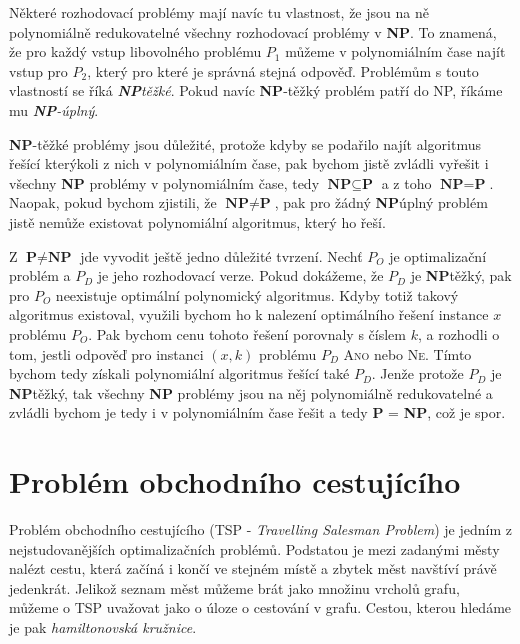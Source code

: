 \documentclass[
  printversion=false,
  joinlists=true,
  glossaries=true,
  figures=true,
  tables=true,
  sourcecodes=false,
  theorems=false,
  bibencoding=utf8,
  language=czech,
  encoding=utf8,
  program=infpvs,
  index=true,
  biblatex=true
]{kidiplom}
\begin{document}
Některé rozhodovací problémy mají navíc tu vlastnost, že jsou na ně polynomiálně redukovatelné všechny rozhodovací problémy v \textbf{NP}. To znamená, že pro každý vstup libovolného problému $P_1$ můžeme v polynomiálním čase najít vstup pro $P_2$, který pro které je správná stejná odpověď. Problémům s touto vlastností se říká \textit{\textbf{NP}\textendash těžké}. Pokud navíc \textbf{NP}-těžký problém patří do NP, říkáme mu \textit{\textbf{NP}-úplný}.

\textbf{NP}-těžké problémy jsou důležité, protože kdyby se podařilo najít algoritmus řešící kterýkoli z nich v polynomiálním čase, pak bychom jistě zvládli vyřešit i všechny \textbf{NP} problémy v polynomiálním čase, tedy $\textbf{NP} \subseteq \textbf{P}$ a z toho $\textbf{NP} = \textbf{P}$. Naopak, pokud bychom zjistili, že $\textbf{NP} \neq \textbf{P}$, pak pro žádný \textbf{NP}\textendash úplný problém jistě nemůže existovat polynomiální algoritmus, který ho řeší.

Z $\textbf{P} \neq \textbf{NP}$ jde vyvodit ještě jedno důležité tvrzení. Nechť $P_O$ je optimalizační problém a $P_D$ je jeho rozhodovací verze. Pokud dokážeme, že $P_D$ je \textbf{NP}\textendash těžký, pak pro $P_O$ neexistuje optimální polynomický algoritmus. Kdyby totiž takový algoritmus existoval, využili bychom ho k nalezení optimálního řešení instance $x$ problému $P_O$. Pak bychom cenu tohoto řešení porovnaly s číslem $k$, a rozhodli o tom, jestli odpověď pro instanci $(x, k)$ problému $P_D$ \textsc{Ano} nebo \textsc{Ne}. Tímto bychom tedy získali polynomiální algoritmus řešící také $P_D$. Jenže protože $P_D$ je \textbf{NP}\textendash těžký, tak všechny \textbf{NP} problémy jsou na něj polynomiálně redukovatelné a zvládli bychom je tedy i v polynomiálním čase řešit a tedy \textbf{P} = \textbf{NP}, což je spor.


\pagebreak
\section{Problém obchodního cestujícího}
Problém obchodního cestujícího (TSP - \textit{Travelling Salesman Problem}) je jedním z nejstudovanějších optimalizačních problémů. Podstatou je mezi zadanými městy nalézt cestu, která začíná i končí ve stejném místě a zbytek měst navštíví právě jedenkrát. Jelikož seznam měst můžeme brát jako množinu vrcholů grafu, můžeme o TSP uvažovat jako o úloze o cestování v grafu. Cestou, kterou hledáme je pak \textit{hamiltonovská kružnice}.
\end{document}
